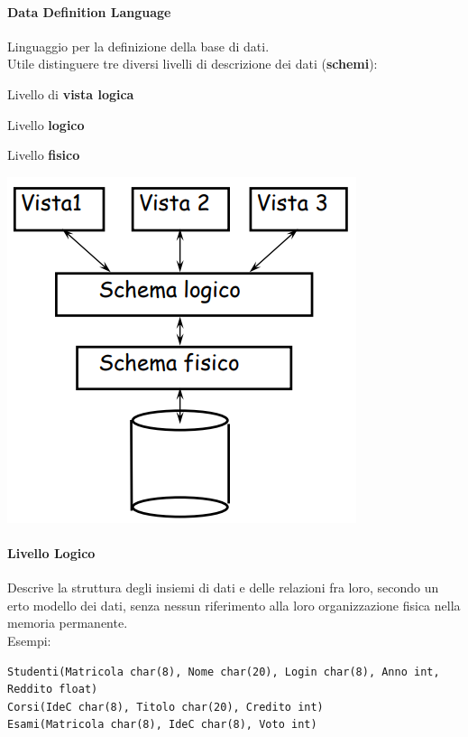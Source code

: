 \documentclass[10pt]{book}
\begin{document}
\paragraph{Data Definition Language} Linguaggio per la definizione della base di dati.\\
Utile distinguere tre diversi livelli di descrizione dei dati (\textbf{schemi}):
\begin{multicols}{2}
\begin{list}{}{}
	\item Livello di \textbf{vista logica}
	\item Livello \textbf{logico}
	\item Livello \textbf{fisico}
\end{list}
\begin{center}
	\includegraphics[scale=0.5]{livellidescrdati.png}
\end{center}
\end{multicols}
\paragraph{Livello Logico} Descrive la struttura degli insiemi di dati e delle relazioni fra loro, secondo un erto modello dei dati, senza nessun riferimento alla loro organizzazione fisica nella memoria permanente.\\
Esempi:
\begin{lstlisting}
Studenti(Matricola char(8), Nome char(20), Login char(8), Anno int, Reddito float)
Corsi(IdeC char(8), Titolo char(20), Credito int)
Esami(Matricola char(8), IdeC char(8), Voto int)
\end{lstlisting}
\end{document}
